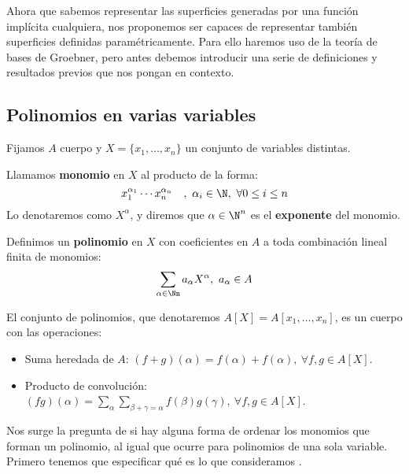 
Ahora que sabemos representar las superficies generadas por una función implícita cualquiera, nos proponemos ser capaces de representar también superficies definidas paramétricamente. Para ello haremos uso de la teoría de bases de Groebner, pero antes debemos introducir una serie de definiciones y resultados previos que nos pongan en contexto.

\subsection{Polinomios en varias variables}
Fijamos $A$ cuerpo y $X=\{x_1, \dots, x_n\}$ un conjunto de variables distintas.

\begin{definicion}
    Llamamos \textbf{monomio} en $X$ al producto de la forma:
    $$x_1^{\alpha_1} \cdots x_n^{\alpha_n}\quad,\ \alpha_i \in \N,\ \forall  0\le i \le n$$
    Lo denotaremos como $X^{\alpha}$, y diremos que $\alpha\in \N^n$ es el \textbf{exponente} del monomio.
\end{definicion}

\begin{definicion}
    Definimos un \textbf{polinomio} en $X$ con coeficientes en $A$ a toda combinación lineal finita de monomios: 
    \begin{equation*}
        \sum_{\alpha\in\Nn} a_{\alpha} X^{\alpha},\ a_\alpha \in A
    \end{equation*}
\end{definicion}

\begin{proposicion}
    El conjunto de polinomios, que denotaremos $A[X] = A[x_1,\dots, x_n]$, es un cuerpo con las operaciones:
    \begin{itemize}
        \item Suma heredada de $A$: $(f+g)(\alpha) = f(\alpha) + f(\alpha),\ \forall f,g\in A[X]$.
        \item Producto de convolución: $(fg)(\alpha) = \sum_{\alpha} \sum_{\beta+\gamma=\alpha} f(\beta)g(\gamma),\ \forall f,g\in A[X]$.
    \end{itemize}

\end{proposicion}

Nos surge la pregunta de si hay alguna forma  de ordenar los monomios que forman un polinomio, al igual que ocurre para polinomios de una sola variable. Primero tenemos que especificar qué es lo que consideramos .

